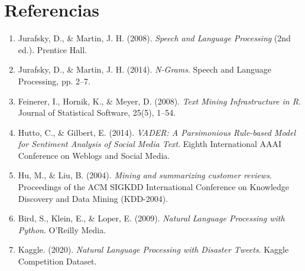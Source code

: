 \documentclass[11pt,a4paper]{article}
\begin{document}
\section*{Referencias}
\begin{enumerate}
    \item Jurafsky, D., \& Martin, J. H. (2008). \textit{Speech and Language Processing} (2nd ed.). Prentice Hall.
    \item Jurafsky, D., \& Martin, J. H. (2014). \textit{N-Grams}. Speech and Language Processing, pp. 2--7.
    \item Feinerer, I., Hornik, K., \& Meyer, D. (2008). \textit{Text Mining Infrastructure in R}. Journal of Statistical Software, 25(5), 1–54.
    \item Hutto, C., \& Gilbert, E. (2014). \textit{VADER: A Parsimonious Rule-based Model for Sentiment Analysis of Social Media Text}. Eighth International AAAI Conference on Weblogs and Social Media.
    \item Hu, M., \& Liu, B. (2004). \textit{Mining and summarizing customer reviews}. Proceedings of the ACM SIGKDD International Conference on Knowledge Discovery and Data Mining (KDD-2004).
    \item Bird, S., Klein, E., \& Loper, E. (2009). \textit{Natural Language Processing with Python}. O'Reilly Media.
    \item Kaggle. (2020). \textit{Natural Language Processing with Disaster Tweets}. Kaggle Competition Dataset.
\end{enumerate}
\end{document}
